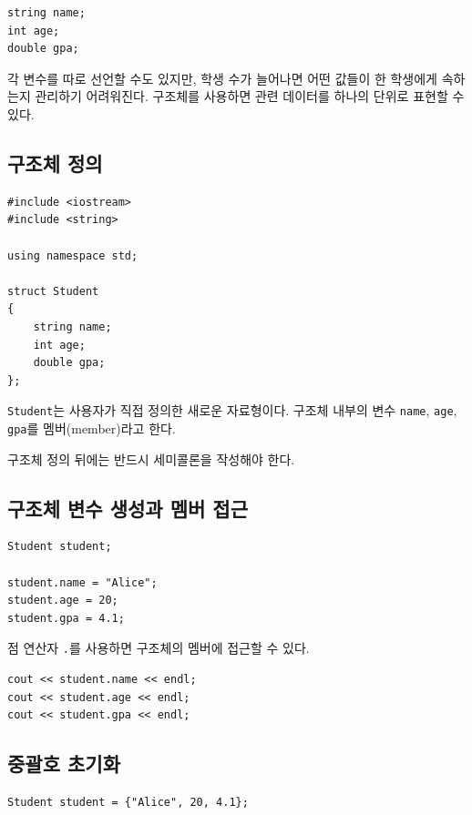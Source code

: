 \documentclass[11pt,a4paper]{article}
\begin{document}
\begin{lstlisting}
string name;
int age;
double gpa;
\end{lstlisting}

각 변수를 따로 선언할 수도 있지만, 학생 수가 늘어나면 어떤 값들이 한 학생에게 속하는지 관리하기 어려워진다.
구조체를 사용하면 관련 데이터를 하나의 단위로 표현할 수 있다.

\subsection{구조체 정의}

\begin{lstlisting}
#include <iostream>
#include <string>

using namespace std;

struct Student
{
    string name;
    int age;
    double gpa;
};
\end{lstlisting}

\texttt{Student}는 사용자가 직접 정의한 새로운 자료형이다.
구조체 내부의 변수 \texttt{name}, \texttt{age}, \texttt{gpa}를 멤버(member)라고 한다.

\begin{importantbox}
구조체 정의 뒤에는 반드시 세미콜론을 작성해야 한다.
\end{importantbox}

\subsection{구조체 변수 생성과 멤버 접근}

\begin{lstlisting}
Student student;

student.name = "Alice";
student.age = 20;
student.gpa = 4.1;
\end{lstlisting}

점 연산자 \texttt{.}를 사용하면 구조체의 멤버에 접근할 수 있다.

\begin{lstlisting}
cout << student.name << endl;
cout << student.age << endl;
cout << student.gpa << endl;
\end{lstlisting}

\subsection{중괄호 초기화}

\begin{lstlisting}
Student student = {"Alice", 20, 4.1};
\end{lstlisting}
\end{document}
